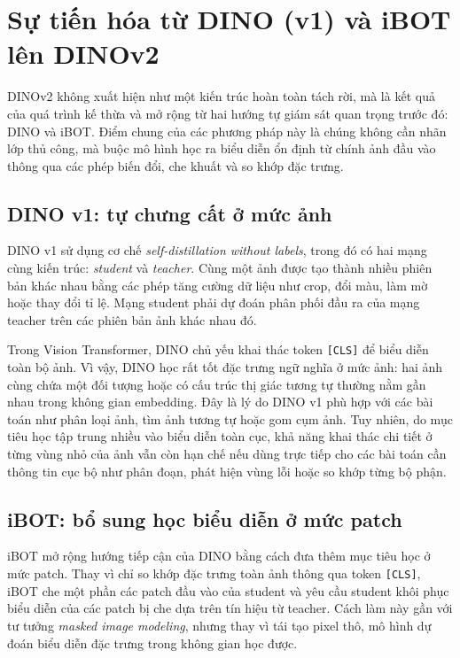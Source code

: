 \section{Sự tiến hóa từ DINO (v1) và iBOT lên DINOv2}
DINOv2 không xuất hiện như một kiến trúc hoàn toàn tách rời, mà là kết quả của quá trình kế thừa và mở rộng từ hai hướng tự giám sát quan trọng trước đó: DINO và iBOT. Điểm chung của các phương pháp này là chúng không cần nhãn lớp thủ công, mà buộc mô hình học ra biểu diễn ổn định từ chính ảnh đầu vào thông qua các phép biến đổi, che khuất và so khớp đặc trưng.

\subsection{DINO v1: tự chưng cất ở mức ảnh}
DINO v1 sử dụng cơ chế \textit{self-distillation without labels}, trong đó có hai mạng cùng kiến trúc: \textit{student} và \textit{teacher}. Cùng một ảnh được tạo thành nhiều phiên bản khác nhau bằng các phép tăng cường dữ liệu như crop, đổi màu, làm mờ hoặc thay đổi tỉ lệ. Mạng student phải dự đoán phân phối đầu ra của mạng teacher trên các phiên bản ảnh khác nhau đó.

Trong Vision Transformer, DINO chủ yếu khai thác token \texttt{[CLS]} để biểu diễn toàn bộ ảnh. Vì vậy, DINO học rất tốt đặc trưng ngữ nghĩa ở mức ảnh: hai ảnh cùng chứa một đối tượng hoặc có cấu trúc thị giác tương tự thường nằm gần nhau trong không gian embedding. Đây là lý do DINO v1 phù hợp với các bài toán như phân loại ảnh, tìm ảnh tương tự hoặc gom cụm ảnh. Tuy nhiên, do mục tiêu học tập trung nhiều vào biểu diễn toàn cục, khả năng khai thác chi tiết ở từng vùng nhỏ của ảnh vẫn còn hạn chế nếu dùng trực tiếp cho các bài toán cần thông tin cục bộ như phân đoạn, phát hiện vùng lỗi hoặc so khớp từng bộ phận.

\subsection{iBOT: bổ sung học biểu diễn ở mức patch}
iBOT mở rộng hướng tiếp cận của DINO bằng cách đưa thêm mục tiêu học ở mức patch. Thay vì chỉ so khớp đặc trưng toàn ảnh thông qua token \texttt{[CLS]}, iBOT che một phần các patch đầu vào của student và yêu cầu student khôi phục biểu diễn của các patch bị che dựa trên tín hiệu từ teacher. Cách làm này gần với tư tưởng \textit{masked image modeling}, nhưng thay vì tái tạo pixel thô, mô hình dự đoán biểu diễn đặc trưng trong không gian học được.

